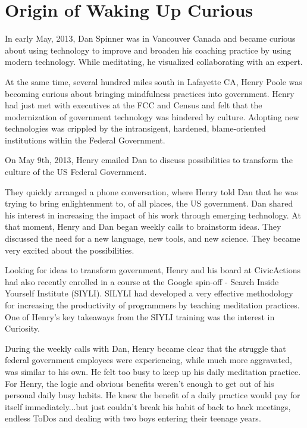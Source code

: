 \documentclass[12pt]{book}
\begin{document}
\chapter{Origin of Waking Up Curious}

In early May, 2013, Dan Spinner was in Vancouver Canada and became
curious about using technology to improve and broaden his coaching
practice by using modern technology. While meditating, he visualized
collaborating with an expert.

At the same time, several hundred miles south in Lafayette CA, Henry
Poole was becoming curious about bringing mindfulness practices into
government. Henry had just met with executives at the FCC and Census
and felt that the modernization of government technology was hindered
by culture. Adopting new technologies was crippled by the
intransigent, hardened, blame-oriented institutions within the Federal
Government.

On May 9th, 2013, Henry emailed Dan to discuss possibilities to
transform the culture of the US Federal Government.

They quickly arranged a phone conversation, where Henry told Dan that
he was trying to bring enlightenment to, of all places, the US
government. Dan shared his interest in increasing the impact of his
work through emerging technology. At that moment, Henry and Dan began
weekly calls to brainstorm ideas. They discussed the need for a new
language, new tools, and new science. They became very excited about
the possibilities.

Looking for ideas to transform government, Henry and his board at
CivicActions had also recently enrolled in a course at the Google
spin-off - Search Inside Yourself Institute (SIYLI). SILYLI had
developed a very effective methodology for increasing the productivity
of programmers by teaching meditation practices. One of Henry's key
takeaways from the SIYLI training was the interest in Curiosity.

During the weekly calls with Dan, Henry became clear that the struggle
that federal government employees were experiencing, while much more
aggravated, was similar to his own. He felt too busy to keep up his
daily meditation practice. For Henry, the logic and obvious benefits
weren't enough to get out of his personal daily busy habits. He knew
the benefit of a daily practice would pay for itself immediately...but
just couldn't break his habit of back to back meetings, endless ToDos
and dealing with two boys entering their teenage years.
\end{document}
